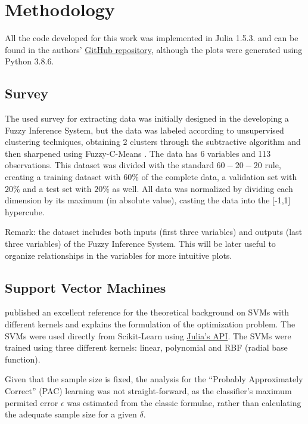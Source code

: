 \documentclass[conference]{IEEEtran}
\theoremstyle{definition}
\theoremstyle{remark}
\theoremstyle{remark}
\begin{document}
\section{Methodology}\label{sec:meth}
All the code developed for this work was implemented in Julia 1.5.3. and
can be found in the authors'
\href{https://github.com/juanscr/ai-works}{GitHub repository}, although the
plots were generated using Python 3.8.6.

\subsection{Survey}
The used survey for extracting data was initially designed in the developing
a Fuzzy Inference System, but the data was labeled according to
unsupervised clustering techniques, obtaining 2 clusters through the subtractive
algorithm \parencite{chiu1994} and then sharpened using Fuzzy-C-Means
\parencite{dunn1973}. The data has 6 variables and 113 observations. This
dataset was divided with the standard $60-20-20$ rule, creating a training
dataset with $60\%$ of the complete data, a validation set with $20\%$ and a
test set with $20\%$ as well. All data was normalized by dividing each dimension
by its maximum (in absolute value), casting the data into the [-1,1] hypercube.

Remark: the dataset includes both inputs (first three variables) and outputs
(last three variables) of the Fuzzy Inference System. This will be later
useful to organize relationships in the variables for more intuitive plots.

\subsection{Support Vector Machines}
\textcite{burges1998} published an excellent reference for the theoretical
background on SVMs with different kernels and explains the formulation of the
optimization problem. The SVMs were used directly from Scikit-Learn
\parencite{scikit-learn, sklearn_api} using
\href{https://bit.ly/3lDHADX}{Julia's API}. The SVMs were trained using three
different kernels: linear, polynomial and RBF (radial base function).

Given that the sample size is fixed, the analysis for the ``Probably
Approximately Correct'' (PAC) learning was not straight-forward, as the
classifier's maximum permited error $\epsilon$ was estimated from the classic
formulae, rather than calculating the adequate sample size for a given $\delta$.
\end{document}
